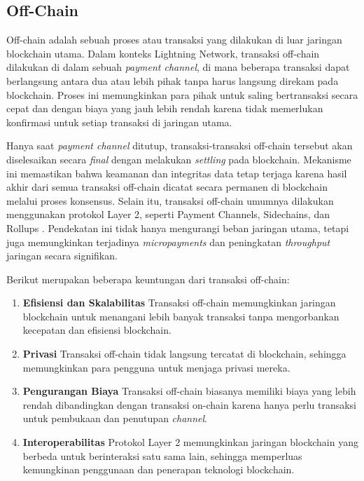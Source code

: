 \subsection{Off-Chain}
\label{subsec:offchain}

Off-chain adalah sebuah proses atau transaksi yang dilakukan di luar jaringan blockchain utama. Dalam konteks Lightning Network, transaksi off-chain dilakukan di dalam sebuah \textit{payment channel}, di mana beberapa transaksi dapat berlangsung antara dua atau lebih pihak tanpa harus langsung direkam pada blockchain. Proses ini memungkinkan para pihak untuk saling bertransaksi secara cepat dan dengan biaya yang jauh lebih rendah karena tidak memerlukan konfirmasi untuk setiap transaksi di jaringan utama.

Hanya saat \textit{payment channel} ditutup, transaksi-transaksi off-chain tersebut akan diselesaikan secara \textit{final} dengan melakukan \textit{settling} pada blockchain. Mekanisme ini memastikan bahwa keamanan dan integritas data tetap terjaga karena hasil akhir dari semua transaksi off-chain dicatat secara permanen di blockchain melalui proses konsensus. Selain itu, transaksi off-chain umumnya dilakukan menggunakan protokol Layer 2, seperti Payment Channels, Sidechains, dan Rollups \parencite{sguanci2021layer}. Pendekatan ini tidak hanya mengurangi beban jaringan utama, tetapi juga memungkinkan terjadinya \textit{micropayments} dan peningkatan \textit{throughput} jaringan secara signifikan.

Berikut merupakan beberapa keuntungan dari transaksi off-chain:

\begin{enumerate}
	\item \textbf{Efisiensi dan Skalabilitas} \newline
	      Transaksi off-chain memungkinkan jaringan blockchain untuk menangani lebih banyak transaksi tanpa mengorbankan kecepatan dan efisiensi blockchain.
	\item \textbf{Privasi} \newline
	      Transaksi off-chain tidak langsung tercatat di blockchain, sehingga memungkinkan para pengguna untuk menjaga privasi mereka.
	\item \textbf{Pengurangan Biaya} \newline
	      Transaksi off-chain biasanya memiliki biaya yang lebih rendah dibandingkan dengan transaksi on-chain karena hanya perlu transaksi untuk pembukaan dan penutupan \textit{channel}.
	\item \textbf{Interoperabilitas} \newline
	      Protokol Layer 2 memungkinkan jaringan blockchain yang berbeda untuk berinteraksi satu sama lain, sehingga memperluas kemungkinan penggunaan dan penerapan teknologi blockchain.
\end{enumerate}
